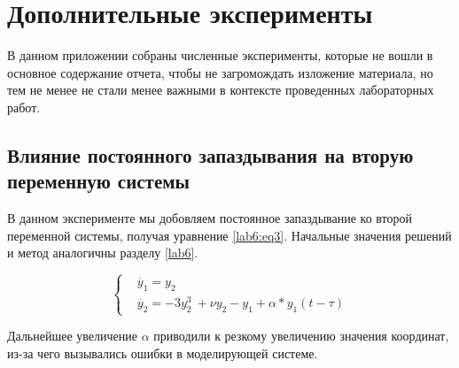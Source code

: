 \chapter{Дополнительные эксперименты}

В данном приложении собраны численные эксперименты, которые
не вошли в основное содержание отчета, чтобы не загромождать
изложение материала, но тем не менее не стали менее важными
в контексте проведенных лабораторных работ.

\section{Влияние постоянного запаздывания на вторую
переменную системы}

В данном эксперименте мы добовляем постоянное запаздывание
ко второй переменной системы, получая уравнение \ref{lab6:eq3}.
Начальные значения решений и метод аналогичны разделу \ref{lab6}.

\begin{equation}\label{lab6:eq3}
    \begin{cases}
        &\dot{y_1} = y_2\\
        &\dot{y_2} = -3y_2^3\ + \nu y_2 - y_1  + \alpha * y_1(t-\tau)
    \end{cases}
\end{equation}

\clearpage
{}
Дальнейшее увеличение $\alpha$ приводили к резкому увеличению значения координат,
из-за чего вызывались ошибки в моделирующей системе.